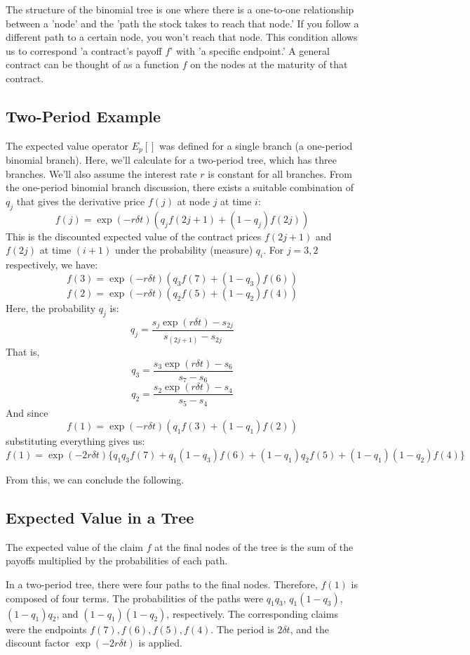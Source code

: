 \documentclass[uplatex,a4j,12pt,dvipdfmx]{jsarticle}
\begin{document}
The structure of the binomial tree is one where there is a one-to-one relationship between a 'node' and the 'path the stock takes to reach that node.' If you follow a different path to a certain node, you won't reach that node. This condition allows us to correspond 'a contract's payoff $f$' with 'a specific endpoint.' A general contract can be thought of as a function $f$ on the nodes at the maturity of that contract.

\subsection{Two-Period Example}
The expected value operator $E_p[]$ was defined for a single branch (a one-period binomial branch). Here, we'll calculate for a two-period tree, which has three branches. We'll also assume the interest rate $r$ is constant for all branches. From the one-period binomial branch discussion, there exists a suitable combination of $q_j$ that gives the derivative price $f(j)$ at node $j$ at time $i$:
\[f(j) = \exp(-r\delta t) ( q_j f(2j+1) + ( 1 -q_j )f(2j) )\]
This is the discounted expected value of the contract prices $f(2j+1)$ and $f(2j)$ at time $(i+1)$ under the probability (measure) $q_i$. For $j=3,2$ respectively, we have:
\[f(3) = \exp(-r\delta t) ( q_3 f(7) + ( 1 -q_3 )f(6) )\]
\[f(2) = \exp(-r\delta t) ( q_2 f(5) + ( 1 -q_2 )f(4) )\]
Here, the probability $q_j$ is:
\[q_j = \frac{s_j \exp(r\delta t) - s_{2j}}{s_{(2j+1)} - s_{2j}}\]
That is,
\[q_3 = \frac{s_3 \exp(r\delta t) - s_6}{s_7 - s_6}\]
\[q_2 = \frac{s_2 \exp(r\delta t) - s_4}{s_5 - s_4}\]
And since
\[f(1) = \exp(-r\delta t) ( q_1f(3) + ( 1 -q_1 )f(2) )\]
substituting everything gives us:
\[f(1) = \exp(-2r\delta t) \{ q_1 q_3 f(7) + q_1 (1 - q_3) f(6) + (1 - q_1) q_2 f(5) + (1 - q_1) (1 - q_2) f(4) \}\]

From this, we can conclude the following.
\subsection{Expected Value in a Tree}
The expected value of the claim $f$ at the final nodes of the tree is the sum of the payoffs multiplied by the probabilities of each path.

In a two-period tree, there were four paths to the final nodes. Therefore, $f(1)$ is composed of four terms. The probabilities of the paths were $q_1 q_3$, $q_1 (1 - q_3)$, $(1 - q_1) q_2$, and $(1 - q_1) (1 - q_2)$, respectively. The corresponding claims were the endpoints $f(7), f(6), f(5), f(4)$. The period is $2\delta t$, and the discount factor $\exp(-2r\delta t)$ is applied.
\end{document}
